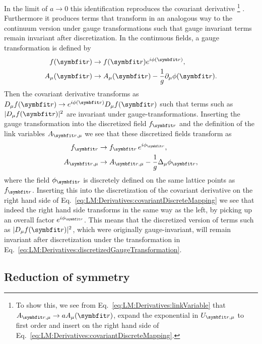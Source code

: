 In the limit of $a\to0$ this identification reproduces the covariant derivative%
\footnote{To show this, we see from Eq.~\eqref{eq:LM:Derivatives:linkVariable} that $A_{\v{r},\mu}\to aA_\mu(\v{r})$, expand the exponential
in $U_{\v{r},\mu}$ to first order and insert on the right hand side of Eq.~\eqref{eq:LM:Derivatives:covariantDiscreteMapping}.}%
. Furthermore it produces terms that transform in an analogous way to the continuum version under gauge transformations such that gauge
invariant terms remain invariant after discretization. In the continuous fields, a gauge transformation is defined by
\begin{equation}
    \label{eq:LM:Derivatives:gaugeTransformation}
    \begin{split}
        f(\v{r})&\to f(\v{r})e^{i\phi(\v{r})},\\
        A_\mu(\v{r})&\to A_\mu(\v{r}) - \frac{1}{g}\partial_\mu\phi(\v{r}).
    \end{split}
\end{equation}
Then the covariant derivative transforms as $D_\mu f(\v{r})\to e^{i\phi(\v{r})}D_\mu f(\v{r})$ such that terms such as $|D_\mu f(\v{r})|^2$
are invariant under gauge-transformations. Inserting the gauge transformation into the discretized field $f_\v{r}$ and the definition of the
link variables $A_{\v{r},\mu}$ we see that these discretized fields transform as
\begin{equation}
    \label{eq:LM:Derivatives:discretizedGaugeTransformation}
    \begin{split}
        f_\v{r}&\to f_\v{r}\,e^{i\phi_\v{r}},\\
        A_{\v{r},\mu}&\to A_{\v{r},\mu} - \frac{1}{g}\Delta_\mu\phi_\v{r},
    \end{split}
\end{equation}
where the field $\phi_\v{r}$ is discretely defined on the same lattice points as $f_\v{r}$. Inserting this into the
discretization of the covariant derivative on the right hand side of Eq.~\eqref{eq:LM:Derivatives:covariantDiscreteMapping} we see that indeed
the right hand side transforms in the same way as the left, \ie by picking up an overall factor $e^{i\phi_{\v{r}}}$. This means that
the discretized version of terms such as $|D_\mu f(\v{r})|^2$, which were originally gauge-invariant, will remain invariant after discretization
under the transformation in Eq.~\eqref{eq:LM:Derivatives:discretizedGaugeTransformation}.

\subsection{Reduction of symmetry}

